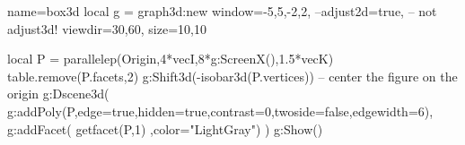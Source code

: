 \documentclass{standalone}
\begin{document}
\begin{luadraw}{name=box3d}
local g = graph3d:new{
    window={-5,5,-2,2},
    --adjust2d=true,  -- not adjust3d!
    viewdir={30,60},
    size={10,10}
}

local P = parallelep(Origin,4*vecI,8*g:ScreenX(),1.5*vecK)
table.remove(P.facets,2)
g:Shift3d(-isobar3d(P.vertices)) -- center the figure on the origin
g:Dscene3d(
    g:addPoly(P,{edge=true,hidden=true,contrast=0,twoside=false,edgewidth=6}),
    g:addFacet( getfacet(P,1) ,{color="LightGray"})
)
g:Show()
\end{luadraw}
\end{document}
